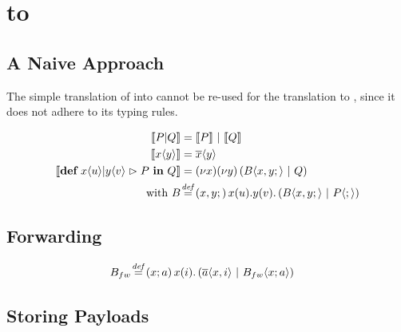 \section{\CoreJoinCalc to \ActorPiCalc}

\subsection{A Naive Approach}

The simple translation of \joincalc into \asyncpicalc
\cite{fournet_reflexive_1996}
cannot be re-used for the translation to \actorpicalc,
since it does not adhere to its typing rules.

\begin{align*}
  \encMJtoAP{P \jpar Q}
  &= \encMJtoAP{P} \apar \encMJtoAP{Q}
  \\
  \encMJtoAP{\jsnd{x}{y}}
  &= \asnd{x}{y}
  \\
  \encMJtoAP{\jdef{\jrct{\jrcv{x}{u} \jpat \jrcv{y}{v}}{P}}{Q}}
  &= \anew{x}{\anew{y}{\parens{\ains{B}{x, y}{} \apar Q}}}
  \\
  \text{with }
  \adef*{B}{x,y}{}{\arcv{x}{u} . \arcv{y}{v} . \parens{\ains{B}{x, y}{} \apar \ains{P}{}{}}} \\
\end{align*}




\subsection{Forwarding}


\begin{align*}
  \adef*{B_{fw}}{x}{a}{\arcv{x}{i} . \parens{\asnd{a}{x,i} \apar \ains{B_{fw}}{x}{a}}}
\end{align*}

\subsection{Storing Payloads}


